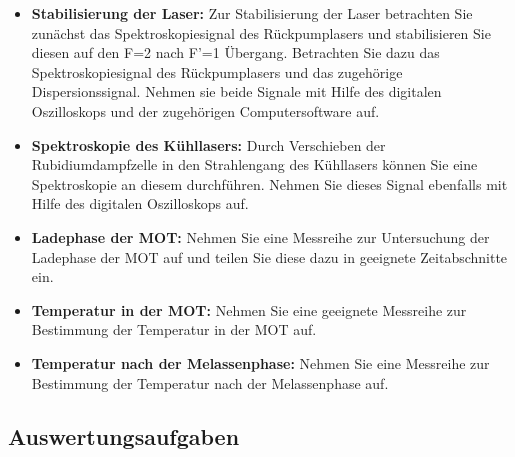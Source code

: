 \documentclass[
class=book,
accentcolor=1b,
custommargins=geometry,
fontsize=11pt,
thesis={type=Versuchsanleitung},
ruledheaders=all,
headline=false,
instbox=false,
marginpar=false,
title=small,
ignore-missing-data=true,
twoside=false,
pdfa=false %
]{apqpub}
\begin{document}
\begin{itemize}
	
	\item \textbf{Stabilisierung der Laser:} Zur Stabilisierung der Laser betrachten Sie zunächst das Spektroskopiesignal des Rückpumplasers und stabilisieren Sie diesen auf den F=2 nach F'=1 Übergang. Betrachten Sie dazu das Spektroskopiesignal des Rückpumplasers und das zugehörige Dispersionssignal. Nehmen sie beide Signale mit Hilfe des digitalen Oszilloskops und der zugehörigen Computersoftware auf.
	
	\item \textbf{Spektroskopie des Kühllasers:} Durch Verschieben der Rubidiumdampfzelle in den Strahlengang des Kühllasers können Sie eine Spektroskopie an diesem durchführen. Nehmen Sie dieses Signal ebenfalls mit Hilfe des digitalen Oszilloskops auf.
	
	\item \textbf{Ladephase der MOT:} Nehmen Sie eine Messreihe zur Untersuchung der Ladephase der MOT auf und teilen Sie diese dazu in geeignete Zeitabschnitte ein.
	
	\item \textbf{Temperatur in der MOT:} Nehmen Sie eine geeignete Messreihe zur Bestimmung der Temperatur in der MOT auf.
	
	\item \textbf{Temperatur nach der Melassenphase:} Nehmen Sie eine Messreihe zur Bestimmung der Temperatur nach der Melassenphase auf.
	
\end{itemize}

\subsection{Auswertungsaufgaben}
\end{document}
